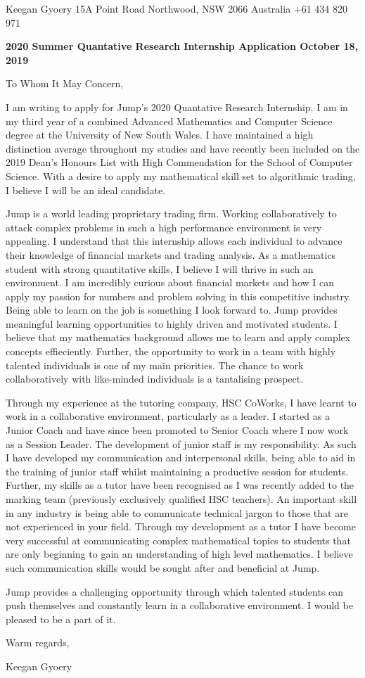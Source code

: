 \documentclass[a4paper,11pt]{article}
\begin{document}
\begin{flushright}
Keegan Gyoery \break
15A Point Road \break
Northwood, NSW 2066 \break
Australia \break
+61 434 820 971 \break
\end{flushright}

\vspace{5mm}
\textbf{2020 Summer Quantative Research Internship Application October 18, 2019} \par
To Whom It May Concern, \par

I am writing to apply for Jump’s 2020 Quantative Research Internship. I am in my third year of a
combined Advanced Mathematics and Computer Science degree at the University of New South
Wales. I have maintained a high distinction average throughout my studies and have recently been
included on the 2019 Dean’s Honours List with High Commendation for the School of Computer
Science. With a desire to apply my mathematical skill set to algorithmic trading, I believe I will
be an ideal candidate.\par

Jump is a world leading proprietary trading firm. Working collaboratively to attack complex problems in such a high performance environment is very appealing. I understand that this internship allows each individual to advance their knowledge of financial markets and trading analysis. As a mathematics student with strong quantitative skills, I believe I will thrive in such an environment. I am incredibly curious about financial markets and how I can apply my passion for numbers and problem solving in this competitive industry. Being able to learn on the job is something I look forward to. Jump provides meaningful learning opportunities to highly driven and motivated students. I believe that my mathematics background allows me to learn and apply complex concepts effieciently. Further, the opportunity to work in a team with highly talented individuals is one of my main priorities. The chance to work collaboratively with like-minded individuals is a tantalising prospect.

Through my experience at the tutoring company, HSC CoWorks, I have learnt to work in a collaborative environment, particularly as a leader. I started as a Junior Coach and have since been promoted to Senior Coach where I now work as a Session Leader. The development of junior staff is my responsibility. As such I have developed my communication and interpersonal skills, being able to aid in the training of junior staff whilst maintaining a productive session for students. Further, my skills as a tutor have been recognised as I was recently added to the marking team (previously exclusively qualified HSC teachers). An important skill in any industry is being able to communicate technical jargon to those that are not experienced in your field. Through my development as a tutor I have become very successful at communicating complex mathematical topics to students that are only beginning to gain an understanding of high level mathematics. I believe such communication skills would be sought after and beneficial at Jump.\par

Jump provides a challenging opportunity through which talented students can push themselves and constantly learn in a collaborative environment. I would be pleased to be a part of it. \par

Warm regards, \par

Keegan Gyoery
\end{document}
